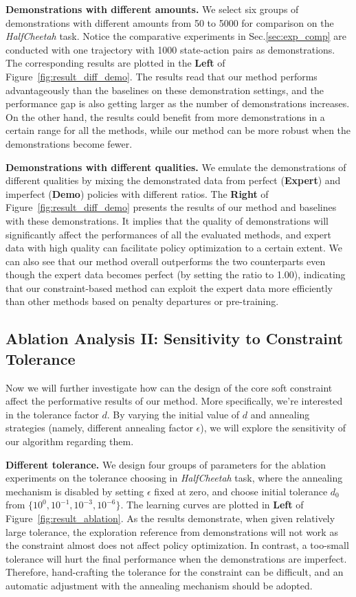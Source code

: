 \documentclass[letterpaper]{article} %
\begin{document}
\noindent
\textbf{Demonstrations with different amounts.} We select six groups of demonstrations with different amounts from 50 to 5000 for comparison on the \textit{HalfCheetah} task. Notice the comparative experiments in Sec.\ref{sec:exp_comp} are conducted with one trajectory with 1000 state-action pairs as demonstrations. The corresponding results are plotted in the \textbf{Left} of Figure~\ref{fig:result_diff_demo}. The results read that our method performs advantageously than the baselines on these demonstration settings, and the performance gap is also getting larger as the number of demonstrations increases. On the other hand, the results could benefit from more demonstrations in a certain range for all the methods, while our method can be more robust when the demonstrations become fewer.

\noindent
\textbf{Demonstrations with different qualities.} We emulate the demonstrations of different qualities by mixing the demonstrated data from perfect (\textbf{Expert}) and imperfect (\textbf{Demo}) policies with different ratios. The \textbf{Right} of Figure~\ref{fig:result_diff_demo} presents the results of our method and baselines with these demonstrations. It implies that the quality of demonstrations will significantly affect the performances of all the evaluated methods, and expert data with high quality can facilitate policy optimization to a certain extent. We can also see that our method overall outperforms the two counterparts even though the expert data becomes perfect (by setting the ratio to 1.00), indicating that our constraint-based method can exploit the expert data more efficiently than other methods based on penalty departures or pre-training.

\subsection{Ablation Analysis II: Sensitivity to Constraint Tolerance}\label{sec:abla2}
Now we will further investigate how can the design of the core soft constraint affect the performative results of our method. More specifically, we're interested in the tolerance factor $d$. By varying the initial value of $d$ and annealing strategies (namely, different annealing factor $\epsilon$), we will explore the sensitivity of our algorithm regarding them.

\noindent
\textbf{Different tolerance.} We design four groups of parameters for the ablation experiments on the tolerance choosing in \textit{HalfCheetah} task, where the annealing mechanism is disabled by setting $\epsilon$ fixed at zero, and choose initial tolerance $d_0$ from $\{10^0,10^{-1},10^{-3},10^{-6}\}$. The learning curves are plotted in \textbf{Left} of Figure~\ref{fig:result_ablation}. As the results demonstrate, when given relatively large tolerance, the exploration reference from demonstrations will not work as the constraint almost does not affect policy optimization. In contrast, a too-small tolerance will hurt the final performance when the demonstrations are imperfect. Therefore, hand-crafting the tolerance for the constraint can be difficult, and an automatic adjustment with the annealing mechanism should be adopted. 
\end{document}
